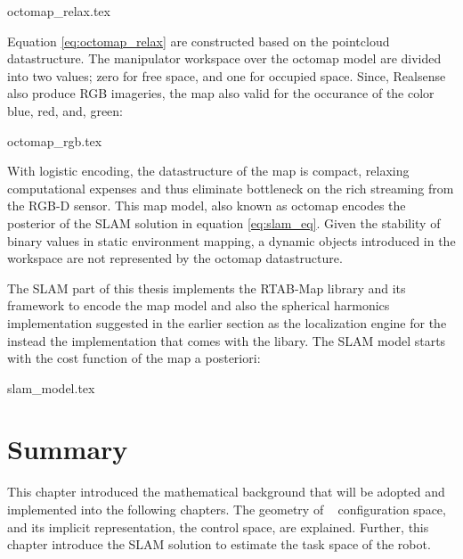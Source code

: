{octomap_relax.tex}

Equation \ref{eq:octomap_relax} are constructed based on the pointcloud
datastructure. The manipulator 
workspace over the octomap model are divided into two values; zero for free
space, and one for occupied space. Since, Realsense also produce RGB 
imageries, the map also valid for the occurance of the color
blue, red, and, green: 

{octomap_rgb.tex}


With logistic encoding, the datastructure of the map is compact, relaxing
computational expenses and thus eliminate bottleneck 
on the rich streaming from the RGB-D sensor. 
This map model, also known as octomap encodes the posterior of the
SLAM solution in equation \ref{eq:slam_eq}. Given
the stability of binary values in static environment mapping, a 
dynamic objects introduced in the workspace are not represented by
the octomap datastructure.

The SLAM part of this thesis implements the RTAB-Map library
and its framework to encode the map model and also the
spherical harmonics implementation suggested in the earlier section as
the localization engine for the instead the implementation that comes
with the libary. The SLAM model starts with the cost function of the map a posteriori: 

{slam_model.tex}

\section{Summary}
This chapter introduced the mathematical background that will be adopted and implemented
into the following chapters. The geometry of \rimini~ configuration space, and its 
implicit representation, the control space, are explained. Further, this chapter
introduce the SLAM solution to estimate the task space of the robot. 

